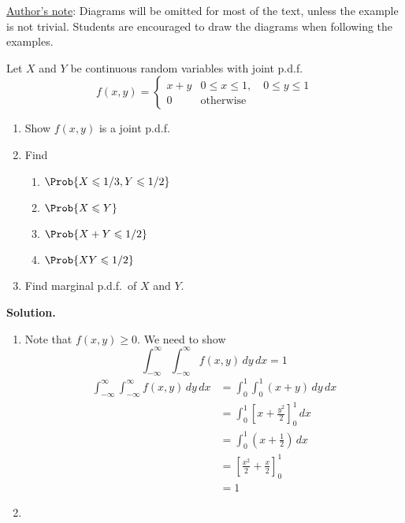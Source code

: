 \underline{Author's note}: Diagrams will be omitted for most of the text,
unless the example is not trivial. Students are encouraged
to draw the diagrams when following the examples.
\begin{Example}{}{}
    Let $ X $ and $ Y $ be continuous random variables
    with joint p.d.f.\
    \[ f(x,y)=
        \begin{cases}
            x+y & 0\leqslant x\leqslant 1,\quad 0\leqslant y\leqslant 1 \\
            0   & \text{otherwise}
        \end{cases} \]
    \begin{enumerate}[label=(\roman*)]
        \item Show $ f(x,y) $ is a joint p.d.f.\
        \item Find
              \begin{enumerate}[label=(\alph*)]
                  \item $ \Prob{X\leqslant 1/3, Y\leqslant 1/2} $
                  \item $ \Prob{X\leqslant Y} $
                  \item $ \Prob{X+Y\leqslant 1/2} $
                  \item $ \Prob{XY\leqslant 1/2} $
              \end{enumerate}
        \item Find marginal p.d.f.\ of $ X $ and $ Y $.
    \end{enumerate}
    \textbf{Solution.}
    \begin{enumerate}[label=(\roman*)]
        \item Note that $ f(x,y)\geqslant 0 $. We need to show
              \[ \int_{-\infty}^{\infty} \int_{-\infty}^{\infty} f(x,y)\, d{y} \, d{x} =1 \]
              \begin{align*}
                  \int_{-\infty}^{\infty} \int_{-\infty}^{\infty} f(x,y)\, d{y} \, d{x}
                   & =\int_{0}^{1} \int_{0}^{1} (x+y)\, d{y} \, d{x}         \\
                   & =\int_{0}^{1} \left[ x+\frac{y^2}{2} \right]_0^1\, d{x} \\
                   & =\int_{0}^{1} \left( x+\frac{1}{2} \right)\, d{x}       \\
                   & =\left[ \frac{x^2}{2}  +\frac{x}{2}\right]_0^1          \\
                   & =1
              \end{align*}
        \item \begin{enumerate}[label=(\alph*)]

\end{enumerate}
\end{enumerate}
\end{Example}
